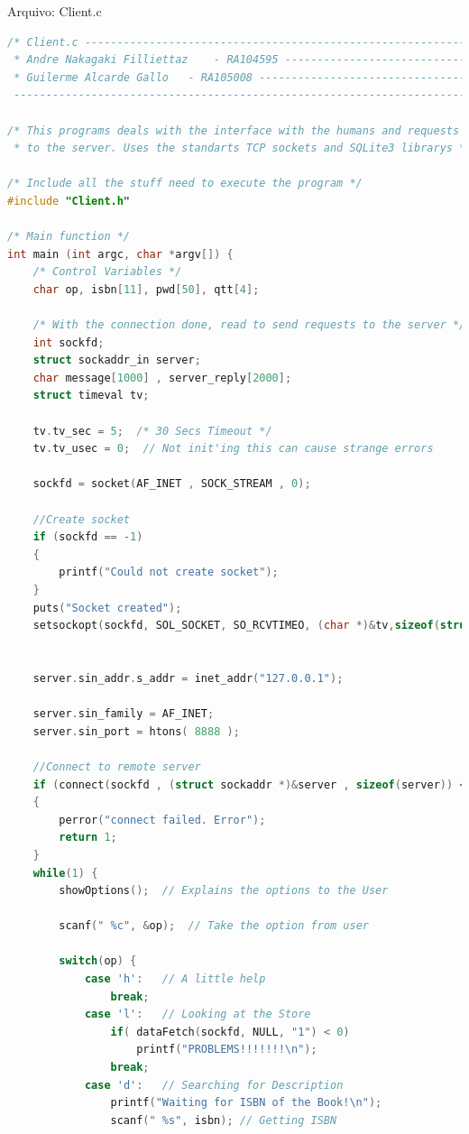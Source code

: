 \documentclass[10pt,a4paper]{report}
\begin{document}
\begin{center}
Arquivo: Client.c
\end{center}
\begin{lstlisting}[language=C]
/* Client.c -------------------------------------------------------------------- 
 * Andre Nakagaki Filliettaz 	- RA104595 ------------------------------------- 
 * Guilerme Alcarde Gallo 	- RA105008 ------------------------------------- 
 ---------------------------------------------------------------------------- */ 

/* This programs deals with the interface with the humans and requests to 
 * to the server. Uses the standarts TCP sockets and SQLite3 librarys */ 

/* Include all the stuff need to execute the program */ 
#include "Client.h" 

/* Main function */ 
int main (int argc, char *argv[]) { 
	/* Control Variables */ 
	char op, isbn[11], pwd[50], qtt[4]; 

	/* With the connection done, read to send requests to the server */ 
	int sockfd; 
	struct sockaddr_in server; 
	char message[1000] , server_reply[2000]; 
	struct timeval tv; 

	tv.tv_sec = 5;  /* 30 Secs Timeout */ 
	tv.tv_usec = 0;  // Not init'ing this can cause strange errors 

	sockfd = socket(AF_INET , SOCK_STREAM , 0); 

	//Create socket 
	if (sockfd == -1) 
	{ 
		printf("Could not create socket"); 
	} 
	puts("Socket created"); 
	setsockopt(sockfd, SOL_SOCKET, SO_RCVTIMEO, (char *)&tv,sizeof(struct timeval)); 


	server.sin_addr.s_addr = inet_addr("127.0.0.1"); 

	server.sin_family = AF_INET; 
	server.sin_port = htons( 8888 ); 

	//Connect to remote server 
	if (connect(sockfd , (struct sockaddr *)&server , sizeof(server)) < 0) 
	{ 
		perror("connect failed. Error"); 
		return 1; 
	} 
	while(1) { 
		showOptions();	// Explains the options to the User 

		scanf(" %c", &op);	// Take the option from user 
 
		switch(op) { 
			case 'h':	// A little help 
				break; 
			case 'l':	// Looking at the Store 
				if( dataFetch(sockfd, NULL, "1") < 0) 
					printf("PROBLEMS!!!!!!!\n"); 
				break; 
			case 'd':	// Searching for Description 
				printf("Waiting for ISBN of the Book!\n"); 
				scanf(" %s", isbn);	// Getting ISBN 


\end{lstlisting}
\end{document}

